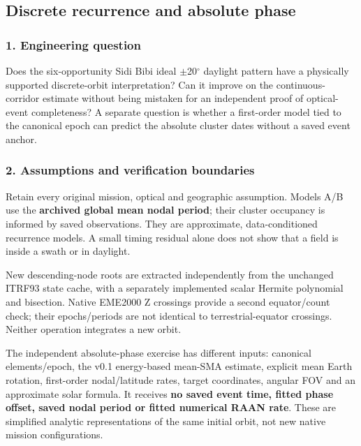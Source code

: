 \documentclass[10pt,a4paper]{article}
\numberwithin{equation}{section}
\begin{document}
\subsection{Discrete recurrence and absolute phase}\label{sec:discrete}

\subsubsection*{1. Engineering question}

\begin{sloppypar}Does the six-opportunity Sidi Bibi ideal \ensuremath{\pm}20\ensuremath{{}^{\circ}} daylight pattern have a physically supported discrete-orbit interpretation? Can it improve on the continuous-corridor estimate without being mistaken for an independent proof of optical-event completeness? A separate question is whether a first-order model tied to the canonical epoch can predict the absolute cluster dates without a saved event anchor.\end{sloppypar}


\subsubsection*{2. Assumptions and verification boundaries}

\begin{sloppypar}Retain every original mission, optical and geographic assumption. Models A/B use the \textbf{archived global mean nodal period}; their cluster occupancy is informed by saved observations. They are approximate, data-conditioned recurrence models. A small timing residual alone does not show that a field is inside a swath or in daylight.\end{sloppypar}


\begin{sloppypar}New descending-node roots are extracted independently from the unchanged ITRF93 state cache, with a separately implemented scalar Hermite polynomial and bisection. Native EME2000 Z crossings provide a second equator/count check; their epochs/periods are not identical to terrestrial-equator crossings. Neither operation integrates a new orbit.\end{sloppypar}


\begin{sloppypar}The independent absolute-phase exercise has different inputs: canonical elements/epoch, the v0.1 energy-based mean-SMA estimate, explicit mean Earth rotation, first-order nodal/latitude rates, target coordinates, angular FOV and an approximate solar formula. It receives \textbf{no saved event time, fitted phase offset, saved nodal period or fitted numerical RAAN rate}. These are simplified analytic representations of the same initial orbit, not new native mission configurations.\end{sloppypar}
\end{document}

